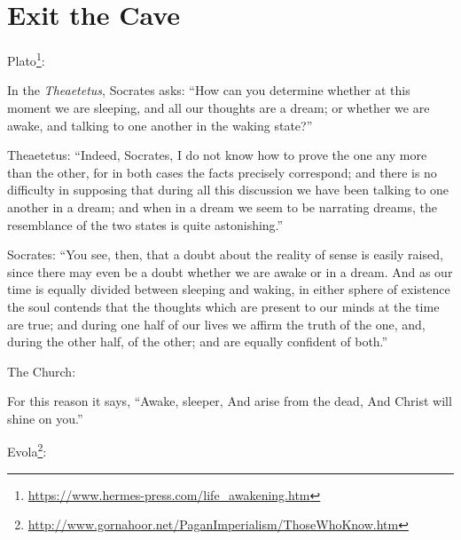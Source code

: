 \section{Exit the Cave}

Plato\footnote{\url{https://www.hermes-press.com/life_awakening.htm}}:

\begin{quotationx}
In the \emph{Theaetetus}, Socrates asks: ``How can you determine whether at this moment we are sleeping, and all our thoughts are a dream; or whether we are awake, and talking to one another in the waking state?''

Theaetetus: ``Indeed, Socrates, I do not know how to prove the one any more than the other, for in both cases the facts precisely correspond; and there is no difficulty in supposing that during all this discussion we have been talking to one another in a dream; and when in a dream we seem to be narrating dreams, the resemblance of the two states is quite astonishing.''

Socrates: ``You see, then, that a doubt about the reality of sense is easily raised, since there may even be a doubt whether we are awake or in a dream. And as our time is equally divided between sleeping and waking, in either sphere of existence the soul contends that the thoughts which are present to our minds at the time are true; and during one half of our lives we affirm the truth of the one, and, during the other half, of the other; and are equally confident of both.''

\end{quotationx}


The Church:

\begin{quotex}
For this reason it says, ``Awake, sleeper, And arise from the dead, And Christ will shine on you.'' 
\end{quotex}


Evola\footnote{\url{http://www.gornahoor.net/PaganImperialism/ThoseWhoKnow.htm}}:

